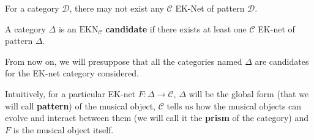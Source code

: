 \begin{rem}
    For a category $\mathcal{D}$, there may not exist any $\mathcal{C}$ EK-Net of pattern $\mathcal{D}$.
\end{rem}

\begin{defn}[EK candidate]
    A category $\Delta$ is an $\text{EKN}_{\mathcal{C}}$ \textbf{candidate} if there exists at least one $\mathcal{C}$ EK-net of pattern $\Delta$.
\end{defn}

\begin{note}
    From now on, we will presuppose that all the categories named $\Delta$ are candidates for the EK-net category considered.
\end{note}

Intuitively, for a particular EK-net $F : \Delta \rightarrow \mathcal{C}$, $\Delta$ will be the global form (that we will call \textbf{pattern}) of the musical object, $\mathcal{C}$ tells us how the musical objects can evolve and interact between them (we will call it the \textbf{prism} of the category) and  $F$ is the musical object itself.








